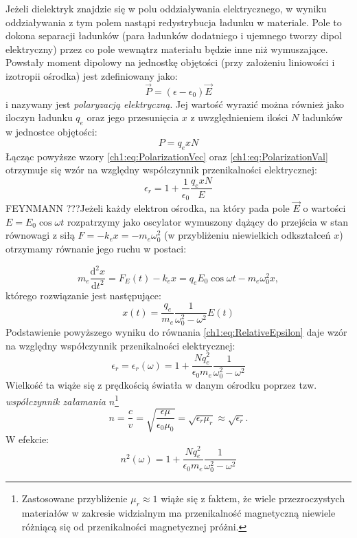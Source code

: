 Jeżeli dielektryk znajdzie się w polu oddziaływania elektrycznego, w wyniku oddziaływania z tym polem nastąpi redystrybucja ładunku w materiale. Pole to dokona separacji ładunków (para ładunków dodatniego i ujemnego tworzy dipol elektryczny) przez co pole wewnątrz materiału będzie inne niż wymuszające. Powstały moment dipolowy na jednostkę objętości (przy założeniu liniowości i izotropii ośrodka) jest zdefiniowany jako:
\begin{equation}
\vec{P} = (\epsilon - \epsilon_0)\vec{E}
\label{ch1:eq:PolarizationVec}
\end{equation}
i nazywany jest \textit{polaryzacją elektryczną}. Jej wartość wyrazić można również jako iloczyn ładunku $q_e$ oraz jego przesunięcia $x$ z uwzględnieniem ilości $N$ ładunków w jednostce objętości:
\begin{equation}
P = q_exN
\label{ch1:eq:PolarizationVal}
\end{equation}
Łącząc powyższe wzory \eqref{ch1:eq:PolarizationVec} oraz \eqref{ch1:eq:PolarizationVal} otrzymuje się wzór na względny współczynnik przenikalności elektrycznej:
\begin{equation}
\epsilon_r = 1 + \frac{1}{\epsilon_0}\frac{q_exN}{E}
\label{ch1:eq:RelativeEpsilon}
\end{equation}
{\color{red}FEYNMANN ???}Jeżeli każdy elektron ośrodka, na który pada pole $\vec{E}$ o wartości $E = E_0\cos\omega t$ rozpatrzymy jako oscylator wymuszony dążący do przejścia w stan równowagi z siłą $F = -k_ex = -m_e\omega_0^2$ (w przybliżeniu niewielkich odkształceń $x$) otrzymamy równanie jego ruchu w postaci:

\begin{equation}
m_e\frac{\mathrm{d^2}x}{\mathrm{d}t^2} = F_E(t) - k_ex = q_eE_0\cos\omega t - m_e\omega_0^2x,
\label{ch1:eq:BasicElectronOscillator}
\end{equation}
którego rozwiązanie jest następujące:
\begin{equation}
x(t) = \frac{q_e}{m_e}\frac{1}{\omega_0^2 - \omega^2 }E(t)
\end{equation}
Podstawienie powyższego wyniku do równania \eqref{ch1:eq:RelativeEpsilon} daje wzór na względny współczynnik przenikalności elektrycznej:
\begin{equation}
\epsilon_r = \epsilon_r(\omega) = 1 + \frac{Nq_e^2}{\epsilon_0m_e}\frac{1}{\omega_0^2 - \omega^2}
\label{ch1:eq:GeneralRelativeEpsilon}
\end{equation}
Wielkość ta wiąże się z prędkością światła w danym ośrodku poprzez tzw. \textit{współczynnik załamania} $n$\footnote{Zastosowane przybliżenie $\mu_r\approx 1$ wiąże się z faktem, że wiele przezroczystych materiałów w zakresie widzialnym ma przenikalność magnetyczną niewiele różniącą się od przenikalności magnetycznej próżni.}
\begin{equation}
n = \frac{c}{v} = \sqrt{\frac{\epsilon\mu}{\epsilon_0\mu_0}} = \sqrt{\epsilon_r\mu_r}\approx\sqrt{\epsilon_r}.
\end{equation}
W efekcie:
\begin{equation}
n^2(\omega) = 1 + \frac{Nq_e^2}{\epsilon_0m_e}\frac{1}{\omega_0^2 - \omega^2}
\label{ch1:eq:RefractionCoeff}
\end{equation}

